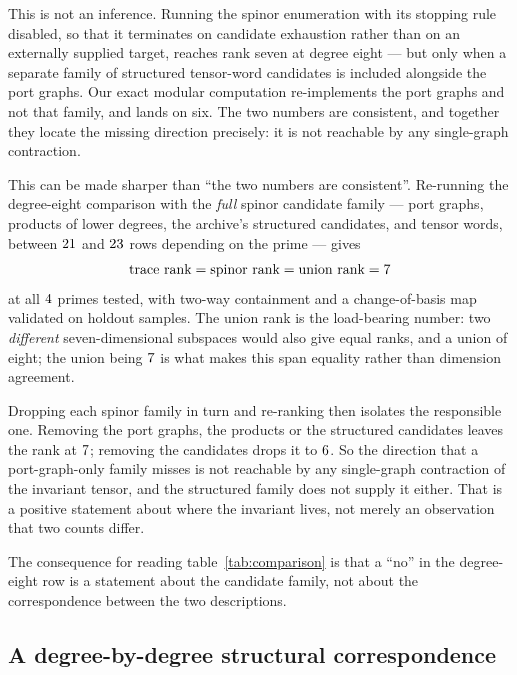 \documentclass[11pt,a4paper]{article}
\begin{document}
This is not an inference. Running the spinor enumeration with its
stopping rule disabled, so that it terminates on candidate exhaustion rather than
on an externally supplied target, reaches rank seven at degree eight --- but only
when a separate family of structured tensor-word candidates is included alongside
the port graphs. Our exact modular computation re-implements the port graphs and
not that family, and lands on six. The two numbers are consistent, and together
they locate the missing direction precisely: it is not reachable by any
single-graph contraction.

This can be made sharper than ``the two numbers are consistent''. Re-running the
degree-eight comparison with the \emph{full} spinor candidate family --- port
graphs, products of lower degrees, the archive's structured candidates, and
tensor words, between $21$ and $23$ rows
depending on the prime --- gives
\begin{equation}
  \text{trace rank} = \text{spinor rank} = \text{union rank}
  = 7
\end{equation}
at all $4$ primes tested, with two-way containment and a
change-of-basis map validated on holdout samples. The union rank is the
load-bearing number: two \emph{different} seven-dimensional subspaces would also
give equal ranks, and a union of eight; the union being $7$ is
what makes this span equality rather than dimension agreement.

Dropping each spinor family in turn and re-ranking then isolates the
responsible one. Removing the port graphs, the products or the structured
candidates leaves the rank at $7$; removing the
\dEightIndispensable{} candidates drops it to $6$. So the
direction that a port-graph-only family misses is not reachable by any
single-graph contraction of the invariant tensor, and the structured family does
not supply it either. That is a positive statement about where the invariant
lives, not merely an observation that two counts differ.

The consequence for reading table~\ref{tab:comparison} is that a ``no'' in the
degree-eight row is a statement about the candidate family, not about the
correspondence between the two descriptions.

\subsection{A degree-by-degree structural correspondence}
\end{document}
